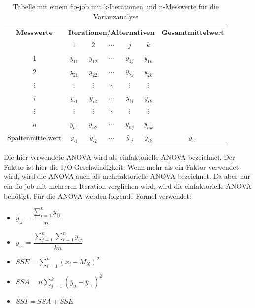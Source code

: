 \begin{table}[h!]
  \centering
  \begin{tabular}{|c|*{5}{c}|c|}
  \hline
  \textbf{Messwerte} & \multicolumn{5}{c|}{\textbf{Iterationen/Alternativen}} & \textbf{Gesamtmittelwert} \\
  \cline{2-6}
   & 1 & 2 & $\cdots$ & $j$ & $k$ & \\
  \hline
  1 & $y_{11}$ & $y_{12}$ & $\cdots$ & $y_{1j}$ & $y_{1k}$ & \\
  2 & $y_{21}$ & $y_{22}$ & $\cdots$ & $y_{2j}$ & $y_{2k}$ & \\
  $\vdots$ & $\vdots$ & $\vdots$ & $\ddots$ & $\vdots$ & $\vdots$ & \\
  $i$ & $y_{i1}$ & $y_{i2}$ & $\cdots$ & $y_{ij}$ & $y_{ik}$ & \\
  $\vdots$ & $\vdots$ & $\vdots$ & $\ddots$ & $\vdots$ & $\vdots$ & \\
  $n$ & $y_{n1}$ & $y_{n2}$ & $\cdots$ & $y_{nj}$ & $y_{nk}$ &  \\
  \hline
  Spaltenmittelwert & $\bar{y}_{\cdot1}$ & $\bar{y}_{\cdot2}$ & $\cdots$ & $\bar{y}_{\cdot j}$ & $\bar{y}_{\cdot k}$ & $\bar{y}_{\cdot \cdot}$ \\
  \hline
  \end{tabular}
  \caption{Tabelle mit einem fio-job mit k-Iterationen und n-Messwerte für die Varianzanalyse}
  \label{tab:measurements}
\end{table}

Die hier verwendete ANOVA wird als einfaktorielle ANOVA bezeichnet.
Der Faktor ist hier die I/O-Geschwindigkeit. Wenn mehr als ein Faktor verwendet wird, wird die ANOVA auch als mehrfaktorielle ANOVA bezeichnet.
Da aber nur ein fio-job mit mehreren Iteration verglichen wird, wird die einfaktorielle ANOVA benötigt.
Für die ANOVA werden folgende Formel verwendet:

\begin{itemize}
  \item $\overline{y}_{\cdot j} = \dfrac{\sum_{i=1}^{n} y_{ij}}{n}$
  \item $\overline{y}_{\cdot \cdot} = \dfrac{\sum_{j=1}^{n} \sum_{i=1}^{n} y_{ij}}{kn}$
  \item $SSE =  \sum_{i=1}^{n} (x_i - M_X)^2$
  \item $SSA = n \sum_{j=1}^{k} (\overline{y}_{\cdot j} - \overline{y}_{\cdot \cdot})^2$
  \item $SST = SSA + SSE$
\end{itemize}


